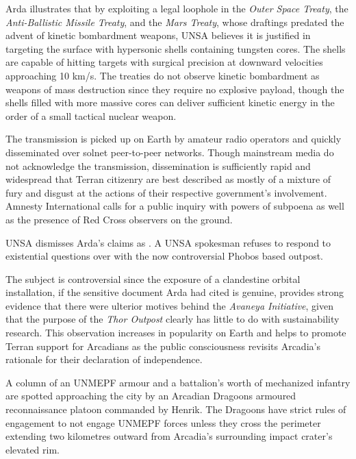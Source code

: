 Arda illustrates that by exploiting a legal loophole in the {\it Outer Space Treaty}, the {\it Anti-Ballistic Missile Treaty}, and the {\it Mars Treaty}, whose draftings predated the advent of kinetic bombardment weapons, UNSA believes it is justified in targeting the surface with hypersonic shells containing tungsten cores. The shells are capable of hitting targets with surgical precision at downward velocities approaching 10 km/s. The treaties do not observe kinetic bombardment as weapons of mass destruction since they require no explosive payload, though the shells filled with more massive cores can deliver sufficient kinetic energy in the order of a small tactical nuclear weapon.

The transmission is picked up on Earth by amateur radio operators and quickly disseminated over solnet peer-to-peer networks. Though mainstream media do not acknowledge the transmission, dissemination is sufficiently rapid and widespread that Terran citizenry are best described as mostly of a mixture of fury and disgust at the actions of their respective government's involvement. Amnesty International calls for a public inquiry with powers of subpoena as well as the presence of Red Cross observers on the ground.

UNSA dismisses Arda's claims as . A UNSA spokesman refuses to respond to existential questions over with the now controversial Phobos based outpost. 

The subject is controversial since the exposure of a clandestine orbital installation, if the sensitive document Arda had cited is genuine, provides strong evidence that there were ulterior motives behind the {\it Avaneya Initiative}, given that the purpose of the {\it Thor Outpost} clearly has little to do with sustainability research. This observation increases in popularity on Earth and helps to promote Terran support for Arcadians as the public consciousness revisits Arcadia's rationale for their declaration of independence.
\StopTimelineDate

A column of an UNMEPF armour and a battalion's worth of mechanized infantry are spotted approaching the city by an Arcadian Dragoons armoured reconnaissance platoon commanded by Henrik. The Dragoons have strict rules of engagement to not engage UNMEPF forces unless they cross the perimeter extending two kilometres outward from Arcadia's surrounding impact crater's elevated rim.

